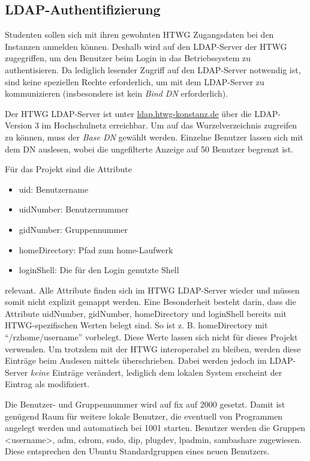 \subsection{LDAP-Authentifizierung}\label{ldap_auth2}

Studenten sollen sich mit ihren gewohnten HTWG Zugangsdaten bei den Instanzen anmelden können. 
Deshalb wird auf den LDAP-Server der HTWG zugegriffen, um den Benutzer beim Login in das Betriebssystem zu authentisieren. 
Da lediglich lesender Zugriff auf den LDAP-Server notwendig ist, sind keine speziellen Rechte erforderlich, um  mit dem LDAP-Server zu kommunizieren (insbesondere ist kein \emph{Bind DN} erforderlich).

Der HTWG LDAP-Server ist unter \url{ldap.htwg-konstanz.de} über die LDAP-Version 3 im Hochschulnetz erreichbar. 
Um auf das Wurzelverzeichnis zugreifen zu können, muss der \emph{Base DN}  gewählt werden. 
Einzelne Benutzer lassen sich mit dem DN  auslesen, wobei die ungefilterte Anzeige auf 50 Benutzer begrenzt ist. 

Für das Projekt sind die Attribute

\begin{itemize}
\item uid: Benutzername
\item uidNumber: Benutzernummer
\item gidNumber: Gruppennummer
\item homeDirectory: Pfad zum home-Laufwerk
\item loginShell: Die für den Login genutzte Shell
\end{itemize}

relevant. Alle Attribute finden sich im HTWG LDAP-Server wieder und müssen somit nicht explizit gemappt werden. 
Eine Besonderheit besteht darin, dass die Attribute uidNumber, gidNumber, homeDirectory und loginShell bereits mit HTWG-spezifischen Werten belegt sind. 
So ist z. B. homeDirectory mit \enquote{/rzhome/username} vorbelegt.
Diese Werte lassen sich nicht für dieses Projekt verwenden.
Um trotzdem mit der HTWG interoperabel zu bleiben, werden diese Einträge beim Auslesen mittels  überschrieben. 
Dabei werden jedoch im LDAP-Server \emph{keine} Einträge verändert, lediglich dem lokalen System erscheint der Eintrag als modifiziert.

Die Benutzer- und Gruppennummer wird auf fix auf 2000 gesetzt.
Damit ist genügend Raum für weitere lokale Benutzer, die eventuell von Programmen angelegt werden und automatisch bei 1001 starten.
Benutzer werden die Gruppen <username>, adm, cdrom, sudo, dip, plugdev, lpadmin, sambashare zugewiesen. 
Diese entsprechen den Ubuntu Standardgruppen eines neuen Benutzers.

